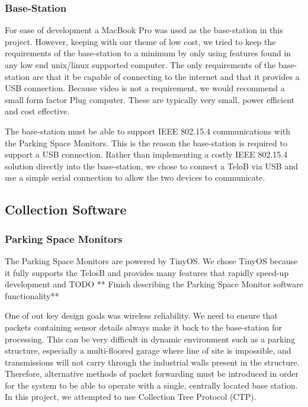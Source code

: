 \documentclass{acm_proc}
\begin{document}
\subsubsection{Base-Station}
For ease of development a MacBook Pro was used as the base-station in this
project.  However, keeping with our theme of low cost, we tried to keep the
requirements of the base-station to a minimum by only using features found
in any low end unix/linux supported computer.  The only requirements of the
base-station are that it be capable of connecting to the internet and that
it provides a USB connection.  Because video is not a requirement, we would
recommend a small form factor Plug computer.  These are typically very
small, power efficient and cost effective.

The base-station must be able to support IEEE 802.15.4 communications with the Parking Space Monitors.  This is the reason the base-station is required to support a USB connection.  Rather than implementing a costly IEEE 802.15.4 solution directly into the base-station, we chose to connect a TeloB via USB and use a simple serial connection to allow the two devices to communicate.  

\subsection{Collection Software}

\subsubsection{Parking Space Monitors}

The Parking Space Monitors are powered by TinyOS.  We chose TinyOS because
it fully supports the TelosB and provides many features that rapidly
speed-up development and TODO ** Finish describing the Parking Space
Monitor software functionality**

One of out key design goals was wireless reliability. We need to ensure that packets containing sensor details always make it back to the base-station for processing.  This can be very difficult in dynamic environment such as a parking structure, especially a multi-floored garage where line of site is impossible, and transmissions will not carry through the industrial walls present in the structure.  Therefore, alternative methods of packet forwarding must be introduced in order for the system to be able to operate with a single, centrally located base station.  In this project, we attempted to use Collection Tree Protocol (CTP).
\end{document}
